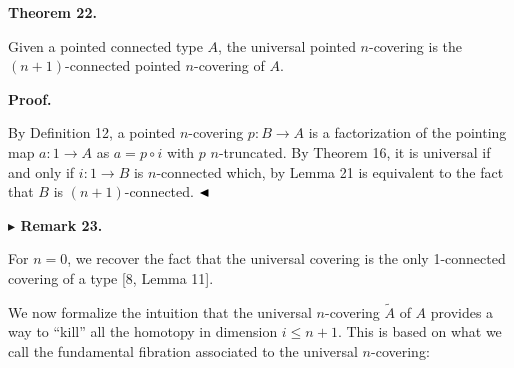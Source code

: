 \documentclass[10pt,a4paper]{article}
\begin{document}
 
 
 
\par\medskip\noindent\textbf{Theorem 22.}\par
 
 
Given a pointed connected type $A$, the universal pointed $n$-covering is the $(n{+}1)$-connected pointed $n$-covering of $A$.\par
 
 
 
 
 
\par\medskip\noindent\textbf{Proof.}\par
 
 
By Definition 12, a pointed $n$-covering $p:B\to A$ is a factorization of the pointing map $a:1\to A$ as $a=p\circ i$ with $p$ $n$-truncated. By Theorem 16, it is universal if and only if $i:1\to B$ is $n$-connected which, by Lemma 21 is equivalent to the fact that $B$ is $(n{+}1)$-connected. $\hfill\blacktriangleleft$\par
 
 
 
\par\medskip\noindent\textbf{$\blacktriangleright$ Remark 23.}\par
 
 
For $n=0$, we recover the fact that the universal covering is the only 1-connected covering of a type [8, Lemma 11].\par
 
 
 
 
We now formalize the intuition that the universal $n$-covering $\tilde{A}$ of $A$ provides a way to “kill” all the homotopy in dimension $i\leq n+1$. This is based on what we call the fundamental fibration associated to the universal $n$-covering:\par
 
\end{document}
